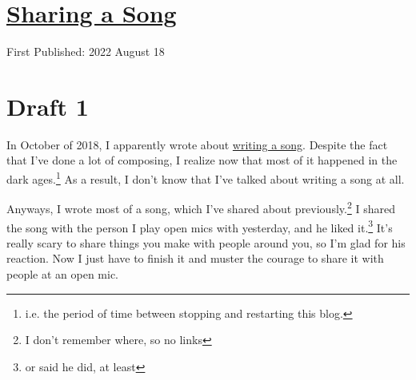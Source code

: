 \documentclass[12pt]{article}[titlepage]
\newcommand{\1}{\={a}}
\newcommand{\2}{\={e}}
\newcommand{\3}{\={\i}}
\newcommand{\4}{\=o}
\newcommand{\5}{\=u}
\newcommand{\6}{\={A}}
\renewcommand{\,}{\textsuperscript{,}}
\begin{document}
\doublespacing
\section{\href{sharing-a-song.html}{Sharing a Song}}
First Published: 2022 August 18
\section{Draft 1}
In October of 2018, I apparently wrote about \href{writing-a-song.html}{writing a song}.
Despite the fact that I've done a lot of composing, I realize now that most of it happened in the dark ages.\footnote{i.e. the period of time between stopping and restarting this blog.}
As a result, I don't know that I've talked about writing a song at all.

Anyways, I wrote most of a song, which I've shared about previously.\footnote{I don't remember where, so no links}
I shared the song with the person I play open mics with yesterday, and he liked it.\footnote{or said he did, at least}
It's really scary to share things you make with people around you, so I'm glad for his reaction.
Now I just have to finish it and muster the courage to share it with people at an open mic.
\end{document}
